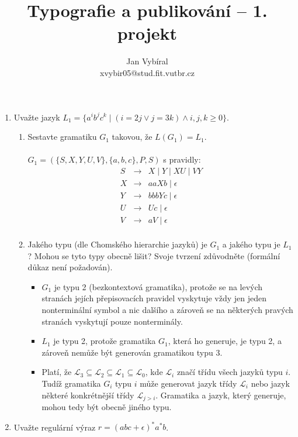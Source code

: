 \documentclass[a4paper,11pt]{article}[24.3.2010]
\author{Jan Vybíral\\xvybir05@stud.fit.vutbr.cz}
\title{Typografie a publikování -- 1. projekt}
\date{}
\begin{document}
\begin{enumerate}
  \item Uvažte jazyk $L_{1}=\{a^i b^j c^k \mid (i = 2j \lor j = 3k) \wedge i,j,k \geq 0\}$.
  \renewcommand{\theenumi}{\alph{enumi}}
  \begin{enumerate}
    \item Sestavte gramatiku $G_{1}$ takovou, že $L(G_{1}) = L_{1}$.\\\\    
      $G_{1}=(\{S,X,Y,U,V\},\{a,b,c\},P,S)$ s pravidly:\\
    \begin{eqnarray*}
      S&\rightarrow&X \mid Y \mid XU \mid VY\\
      X&\rightarrow&aaXb \mid \epsilon\\
      Y&\rightarrow&bbbYc\mid \epsilon\\
      U&\rightarrow&Uc\mid \epsilon\\
      V&\rightarrow&aV\mid \epsilon\\
    \end{eqnarray*}
    \item Jakého typu (dle Chomského hierarchie jazyků) je $G_{1}$ a jakého typu je $L_{1}$? Mohou se tyto typy obecně lišit? Svoje tvrzení zdůvodněte (formální důkaz není požadován).
    \begin{itemize}
        \item $G_{1}$ je typu 2 (bezkontextová gramatika), protože se na levých stranách jejích přepisovacích pravidel vyskytuje vždy jen jeden nonterminální symbol a nic dalšího a zároveň se na některých pravých stranách vyskytují pouze nonterminály.
        \item $L_{1}$ je typu 2, protože gramatika $G_{1}$, která ho generuje, je typu 2, a zároveň nemůže být generován gramatikou typu 3.
        \item  Platí, že $\mathcal{L}_{3} \subseteq \mathcal{L}_{2} \subseteq \mathcal{L}_{1} \subseteq \mathcal{L}_{0}$, kde $\mathcal{L}_{i}$ značí třídu všech jazyků typu $i$. Tudíž gramatika ${G}_{i}$ typu $i$ může generovat jazyk třídy $\mathcal{L}_{i}$ nebo jazyk některé konkrétnější třídy $\mathcal{L}_{j>i}$. Gramatika a jazyk, který generuje, mohou tedy být obecně jiného typu.\\
    \end{itemize}
  \end{enumerate}
  \renewcommand{\theenumi}{\arabic{enumi}}
  \item Uvažte regulární výraz  $r=(abc+\epsilon)^*a^*b$.
  \renewcommand{\theenumi}{\alph{enumi}}

\end{enumerate}
\end{document}
